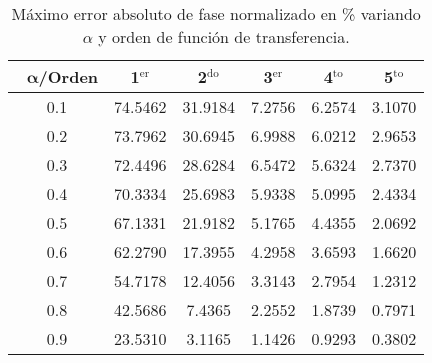 \begin{table}[!hbp]                                 
\centering            
\caption{Máximo error absoluto de fase normalizado en \% variando $\alpha$ y orden de función de transferencia.}                           
\label{tab:max_error_fase_norm}                               
\begin{tabular}{cccccc}
\hline                                             
$\,\,\,\,\bm{\alpha}$\textbf{/Orden} & \textbf{1$^{\mathrm{er}}$} & \textbf{2$^{\mathrm{do}}$} & \textbf{3$^{\mathrm{er}}$} & \textbf{4$^{\mathrm{to}}$} & \textbf{5$^{\mathrm{to}}$} \\                     
\hline                                             
0.1 & 74.5462 & 31.9184 & 7.2756 & 6.2574 & 3.1070 \\
                                             
0.2 & 73.7962 & 30.6945 & 6.9988 & 6.0212 & 2.9653 \\
                                             
0.3 & 72.4496 & 28.6284 & 6.5472 & 5.6324 & 2.7370 \\
                                             
0.4 & 70.3334 & 25.6983 & 5.9338 & 5.0995 & 2.4334 \\
                                             
0.5 & 67.1331 & 21.9182 & 5.1765 & 4.4355 & 2.0692 \\
                                              
0.6 & 62.2790 & 17.3955 & 4.2958 & 3.6593 & 1.6620 \\
                                              
0.7 & 54.7178 & 12.4056 & 3.3143 & 2.7954 & 1.2312 \\
                                               
0.8 & 42.5686 & 7.4365 & 2.2552 & 1.8739 & 0.7971 \\ 
                                              
0.9 & 23.5310 & 3.1165 & 1.1426 & 0.9293 & 0.3802 \\ 
\hline                                             
\end{tabular}                                                             
\end{table}

